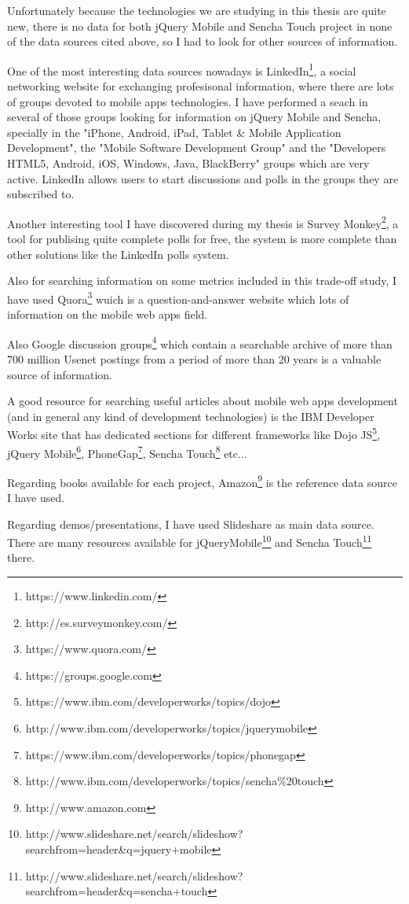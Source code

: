 \documentclass[a4paper,12pt]{book}
\begin{document}
Unfortunately because the technologies we are studying in this thesis are quite new, there is no data for both jQuery Mobile and Sencha Touch project in none of the data sources cited above, so I had to look for other sources of information.

One of the most interesting data sources nowadays is LinkedIn\footnote{https://www.linkedin.com/},  a social networking website for exchanging profesisonal information, where there are lots of groups devoted to mobile apps technologies. I have performed a seach in several of those groups looking for information on jQuery Mobile and Sencha, specially in the "iPhone, Android, iPad, Tablet \& Mobile Application Development"\cite{linkedin1},  the "Mobile Software Development Group"\cite{linkedin2} and the "Developers HTML5, Android, iOS, Windows, Java, BlackBerry"\cite{linkedin3} groups which are very active. LinkedIn allows users to start discussions and polls in the groups they are subscribed to. 

Another interesting tool I have discovered during my thesis is Survey Monkey\footnote{http://es.surveymonkey.com/}, a tool for publising quite complete polls for free, the system is more complete than other solutions like the LinkedIn polls system.

Also for searching information on some metrics included in this trade-off study, I have used Quora\footnote{https://www.quora.com/}  wuich is a question-and-answer website which lots of information on the mobile web apps field.

Also Google discussion groups\footnote{https://groups.google.com} which contain a searchable archive of more than 700 million Usenet postings from a period of more than 20 years is a valuable source of information.

A good resource for searching useful articles about mobile web apps development (and in general any kind of development technologies) is the IBM Developer Works site that has dedicated sections for different frameworks like Dojo JS\footnote{https://www.ibm.com/developerworks/topics/dojo}, jQuery Mobile\footnote{http://www.ibm.com/developerworks/topics/jquerymobile}, PhoneGap\footnote{https://www.ibm.com/developerworks/topics/phonegap}, Sencha Touch\footnote{http://www.ibm.com/developerworks/topics/sencha\%20touch}  etc...	 

Regarding books available for each project, Amazon\footnote{http://www.amazon.com} is the reference data source I have used.

Regarding demos/presentations, I have used Slideshare as main data source. There are many resources available for jQueryMobile\footnote{http://www.slideshare.net/search/slideshow?searchfrom=header\&q=jquery+mobile}  and Sencha Touch\footnote{http://www.slideshare.net/search/slideshow?searchfrom=header\&q=sencha+touch}  there.
\end{document}
